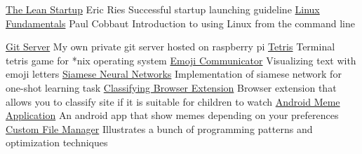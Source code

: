 \documentclass[
	a4paper,
]{fortysecondscv}
\begin{document}
\begin{cvtable}[1.5]
        {\href{https://en.wikipedia.org/wiki/The_Lean_Startup}
        {The Lean Startup}}
        {Eric Ries}
        {Successful startup launching guideline}
        {\href{http://linux-training.be/linuxfun.pdf}
        {Linux Fundamentals}}
        {Paul Cobbaut}
        {Introduction to using Linux from the command line}
\end{cvtable}



\addtobacksidebar{}

\newpage
\begin{sidebar}
    \nameandjob

    \setlength{\parskip}{1ex}

\end{sidebar}

\begin{cvtable}[1.5]
        {\href{http://git.asmirnov.xyz/}
        {Git Server}}{}
        {My own private git server hosted on raspberry pi}
        {\href{https://github.com/SmirnovAlexander/Tetris}
        {Tetris}}{}
        {Terminal tetris game for *nix operating system}
        {\href{https://github.com/SmirnovAlexander/EmojiCommunicator}
        {Emoji Communicator}}{}
        {Visualizing text with emoji letters}
        {\href{https://github.com/SmirnovAlexander/OneShotLearningSiameseNetworks}
        {Siamese Neural Networks}}{}
        {Implementation of siamese network for one-shot learning task}
        {\href{https://github.com/SmirnovAlexander/WebsiteClassifier}
        {Classifying Browser Extension}}{}
        {Browser extension that allows you to classify site if it is suitable for children to watch}
        {\href{https://github.com/SmirnovAlexander/MemDer}
        {Android Meme Application}}{}
        {An android app that show memes depending on your preferences}
        {\href{https://github.com/SmirnovAlexander/SuperManager}
        {Custom File Manager}}{}
        {Illustrates a bunch of programming patterns and optimization techniques}
\end{cvtable}
\end{document}
